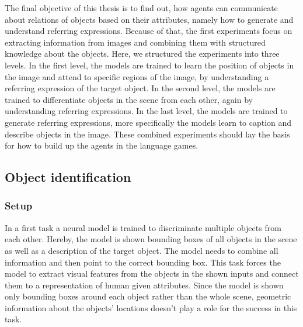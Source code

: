 The final objective of this thesis is to find out, how agents can communicate about relations of objects based on their attributes, namely how to generate and understand referring expressions.
Because of that, the first experiments focus on extracting information from images and combining them with structured knowledge about the objects.
Here, we structured the experiments into three levels.
In the first level, the models are trained to learn the position of objects in the image and attend to specific regions of the image, by understanding a referring expression of the target object.
In the second level, the models are trained to differentiate objects in the scene from each other, again by understanding referring expressions.
In the last level, the models are trained to generate referring expressions, more specifically the models learn to caption and describe objects in the image.
These combined experiments should lay the basis for how to build up the agents in the language games.

\subsection{Object identification}
\label{sec:object-identification}
\subsubsection*{Setup}

In a first task a neural model is trained to discriminate multiple objects from each other.
Hereby, the model is shown bounding boxes of all objects in the scene as well as a description of the target object.
The model needs to combine all information and then point to the correct bounding box.
This task forces the model to extract visual features from the objects in the shown inputs and connect them to a representation of human given attributes.
Since the model is shown only bounding boxes around each object rather than the whole scene, geometric information about the objects' locations doesn't play a role for the success in this task.

